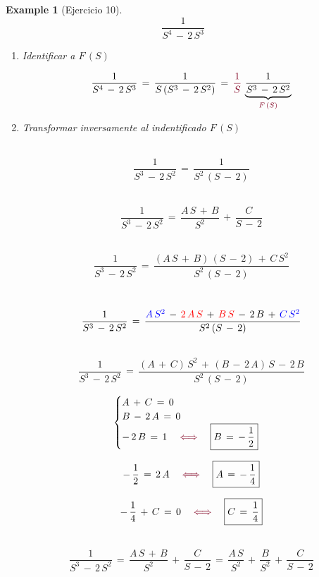 \documentclass[a4paper,11pt,openany]{book}
\newtheorem{exmp}{Example}[section]
\newcommand*{\itembolasazules}[1]{%
\footnotesize\protect\tikz[baseline=-3pt]%
\protect\node[scale=.7, circle, shade, ball
color=green]{\color{white}\Large\bf#1};}
\begin{document}
\begin{exmp}[Ejercicio 10]
 
 
$$\dfrac{1}{S^{4}\,-\,2\,S^{3}}$$
 
\begin{enumerate}[label=\itembolasazules{\arabic*}]
 
\item Identificar a $F\,(S)$
 
$$\dfrac{1}{S^{4}\,-\,2\,S^{3}}\,=\,\dfrac{1}{S\,(S^{3}\,-\,2\,S^{2})}\,=\,\textcolor{burgundy}{\dfrac{1}{S}}\,\underbrace{\dfrac{1}{S^{3}\,-\,2\,S^{2}}}_{\textcolor{burgundy}{F\,(S) } }$$
 
\item Transformar inversamente al indentificado $F\,(S)$
 
\textcolor{burgundy}{}\, $$\dfrac{1}{S^{3}\,-\,2\,S^{2}}\,=\,\dfrac{1}{S^{2}\,(S\,-\,2)}$$
 
\textcolor{burgundy}{}\, $$\dfrac{1}{S^{3}\,-\,2\,S^{2}}\,=\,\dfrac{A\,S\,+\,B}{S^{2}}\,+\,\dfrac{C}{S\,-\,2} $$
 
\textcolor{burgundy}{}\, $$\dfrac{1}{S^{3}\,-\,2\,S^{2}}\,=\,\dfrac{(A\,S\,+\,B)\,(S\,-\,2)\,+\,C\,S^{2} }{S^{2}\,(S\,-\,2) } $$
 
\textcolor{burgundy}{}\, $$\dfrac{1}{S^{3}\,-\,2\,S^{2}}\,=\,\dfrac{\textcolor{blue}{A\,S^{2}}\,-\,\textcolor{red}{2\,A\,S }\,+\,\textcolor{red}{B\,S }\,-\,2\,B\,+\,\textcolor{blue}{C\,S^{2}} }{S^{2}\,(S\,-\,2) } $$
 
\textcolor{burgundy}{}\, $$\dfrac{1}{S^{3}\,-\,2\,S^{2}}\,=\,\dfrac{(A\,+\,C)\,S^{2}\,+\,(B\,-\,2\,A)\,S\,-\,2\,B }{S^{2}\,(S\,-\,2)}$$
 
$$\begin{cases}
A\,+\,C\,=\,0 \\
B\,-\,2\,A\,=\,0 \\
-\,2\,B\,=\,1 \quad \textcolor{burgundy}{\iff } \quad \boxed{B\,=\,-\,\dfrac{1}{2} }  
\end{cases}$$
 
$$-\,\dfrac{1}{2}\,=\,2\,A \quad \textcolor{burgundy}{\iff } \quad \boxed{A\,=\,-\,\dfrac{1}{4}}$$
 
$$-\,\dfrac{1}{4}\,+\,C\,=\,0 \quad \textcolor{burgundy}{\iff } \quad \boxed{C\,=\,\dfrac{1}{4}}$$
 
\textcolor{burgundy}{}\, $$\dfrac{1}{S^{3}\,-\,2\,S^{2}}\,=\,\dfrac{A\,S\,+\,B}{S^{2}}\,+\,\dfrac{C}{S\,-\,2}\,=\,\dfrac{A\,S}{S^{2}}\,+\,\dfrac{B}{S^{2}}\,+\,\dfrac{C}{S\,-\,2} $$
 

\end{enumerate}
\end{exmp}
\end{document}
